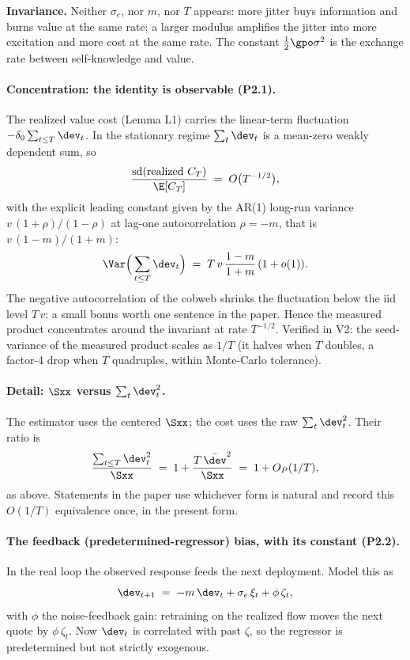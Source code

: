 \textbf{Invariance.} Neither $\sigma_e$, nor $m$, nor $T$ appears: more jitter buys
information and burns value at the same rate; a larger modulus amplifies the jitter
into more excitation and more cost at the same rate. The constant
$\tfrac12\gpo\sigma^2$ is the exchange rate between self-knowledge and value.

\paragraph{Concentration: the identity is observable (P2.1).}
The realized value cost (Lemma L1) carries the linear-term fluctuation
$-\delta_0\sum_{t\le T}\dev_t$. In the stationary regime $\sum_t\dev_t$ is a
mean-zero weakly dependent sum, so
\begin{equation*}
\frac{\operatorname{sd}(\text{realized } C_T)}{\E[C_T]} \;=\; O\big(T^{-1/2}\big),
\end{equation*}
with the explicit leading constant given by the AR(1) long-run variance
$v\,(1+\rho)/(1-\rho)$ at lag-one autocorrelation $\rho=-m$, that is
$v\,(1-m)/(1+m)$:
\begin{equation*}
\Var\Big(\sum_{t\le T}\dev_t\Big)
\;=\; T\,v\,\frac{1-m}{1+m}\,(1+o(1)).
\end{equation*}
The negative autocorrelation of the cobweb shrinks the fluctuation below the iid
level $T\,v$: a small bonus worth one sentence in the paper. Hence the measured
product concentrates around the invariant at rate $T^{-1/2}$. Verified in V2: the
seed-variance of the measured product scales as $1/T$ (it halves when $T$ doubles,
a factor-4 drop when $T$ quadruples, within Monte-Carlo tolerance).

\paragraph{Detail: $\Sxx$ versus $\sum_t\dev_t^2$.}
The estimator uses the centered $\Sxx$; the cost uses the raw $\sum_t\dev_t^2$.
Their ratio is
\begin{equation*}
\frac{\sum_{t\le T}\dev_t^2}{\Sxx}
\;=\; 1+\frac{T\,\bar{\dev}^2}{\Sxx}
\;=\; 1+O_P(1/T),
\end{equation*}
as above. Statements in the paper use whichever form is natural and record this
$O(1/T)$ equivalence once, in the present form.

\paragraph{The feedback (predetermined-regressor) bias, with its constant (P2.2).}
In the real loop the observed response feeds the next deployment. Model this as
\begin{equation*}
\dev_{t+1} \;=\; -m\,\dev_t + \sigma_e\,\xi_t + \phi\,\zeta_t,
\end{equation*}
with $\phi$ the noise-feedback gain: retraining on the realized flow moves the next
quote by $\phi\,\zeta_t$. Now $\dev_t$ is correlated with past $\zeta$, so the
regressor is predetermined but not strictly exogenous.

